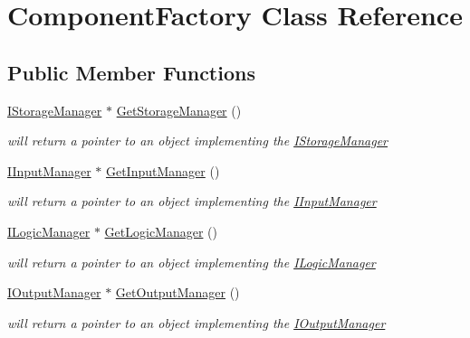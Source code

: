 \hypertarget{class_component_factory}{}\section{Component\+Factory Class Reference}
\label{class_component_factory}
\subsection*{Public Member Functions}
\begin{DoxyCompactItemize}
\item 
\mbox{\label{class_component_factory_aa6178ddfecc39747ef12f11606735e09}} 
\mbox{\hyperlink{class_i_storage_manager}{I\+Storage\+Manager}} $\ast$ \mbox{\hyperlink{class_component_factory_aa6178ddfecc39747ef12f11606735e09}{Get\+Storage\+Manager}} ()
\begin{DoxyCompactList}\small\item\em will return a pointer to an object implementing the \mbox{\hyperlink{class_i_storage_manager}{I\+Storage\+Manager}} \end{DoxyCompactList}\item 
\mbox{\label{class_component_factory_a84613a5a5f11003abd9d10620ca72b5b}} 
\mbox{\hyperlink{class_i_input_manager}{I\+Input\+Manager}} $\ast$ \mbox{\hyperlink{class_component_factory_a84613a5a5f11003abd9d10620ca72b5b}{Get\+Input\+Manager}} ()
\begin{DoxyCompactList}\small\item\em will return a pointer to an object implementing the \mbox{\hyperlink{class_i_input_manager}{I\+Input\+Manager}} \end{DoxyCompactList}\item 
\mbox{\label{class_component_factory_aa8a3b17c86c562cc69f50f283ed3cc28}} 
\mbox{\hyperlink{class_i_logic_manager}{I\+Logic\+Manager}} $\ast$ \mbox{\hyperlink{class_component_factory_aa8a3b17c86c562cc69f50f283ed3cc28}{Get\+Logic\+Manager}} ()
\begin{DoxyCompactList}\small\item\em will return a pointer to an object implementing the \mbox{\hyperlink{class_i_logic_manager}{I\+Logic\+Manager}} \end{DoxyCompactList}\item 
\mbox{\label{class_component_factory_a19583d4fc53d5942e5c0558a52809086}} 
\mbox{\hyperlink{class_i_output_manager}{I\+Output\+Manager}} $\ast$ \mbox{\hyperlink{class_component_factory_a19583d4fc53d5942e5c0558a52809086}{Get\+Output\+Manager}} ()
\begin{DoxyCompactList}\small\item\em will return a pointer to an object implementing the \mbox{\hyperlink{class_i_output_manager}{I\+Output\+Manager}} \end{DoxyCompactList}\end{DoxyCompactItemize}


